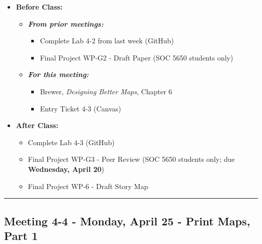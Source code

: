\documentclass[
]{book}
\providecommand{\tightlist}{%
  \setlength{\itemsep}{0pt}\setlength{\parskip}{0pt}}
\begin{document}
\begin{itemize}
\tightlist
\item
  \textbf{Before Class:}

  \begin{itemize}
  \tightlist
  \item
    \textbf{\emph{From prior meetings:}}

    \begin{itemize}
    \tightlist
    \item
      Complete Lab 4-2 from last week (GitHub)
    \item
      Final Project WP-G2 - Draft Paper (SOC 5650 students only)
    \end{itemize}
  \item
    \textbf{\emph{For this meeting:}}

    \begin{itemize}
    \tightlist
    \item
      Brewer, \emph{Designing Better Maps}, Chapter 6
    \item
      Entry Ticket 4-3 (Canvas)
    \end{itemize}
  \end{itemize}
\item
  \textbf{After Class:}

  \begin{itemize}
  \tightlist
  \item
    Complete Lab 4-3 (GitHub)
  \item
    Final Project WP-G3 - Peer Review (SOC 5650 students only; due \textbf{Wednesday, April 20})
  \item
    Final Project WP-6 - Draft Story Map
  \end{itemize}
\end{itemize}

\begin{center}\rule{0.5\linewidth}{0.5pt}\end{center}

\hypertarget{meeting-4-4---monday-april-25---print-maps-part-1}{%
\subsection*{Meeting 4-4 - Monday, April 25 - Print Maps, Part 1}\label{meeting-4-4---monday-april-25---print-maps-part-1}}
\end{document}
